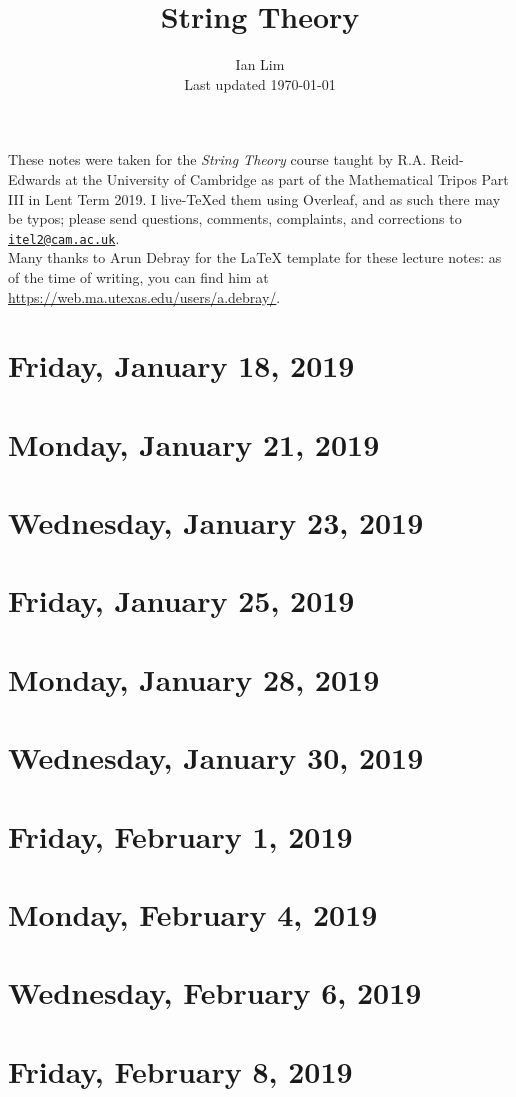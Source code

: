 \documentclass[reqno]{amsart}
\begin{document}
\title{String Theory}
\author{Ian Lim\\ Last updated \today}
\maketitle
{\small\noindent These notes were taken for the \textit{String Theory} course taught by R.A. Reid-Edwards at the University of Cambridge as part of the Mathematical Tripos Part III in Lent Term 2019. I live-\TeX ed them using Overleaf, and as such there may be typos; please send questions, comments, complaints, and corrections to 
\href{mailto:itel2@cam.ac.uk?subject=STR\%20Lecture\%20Notes}{\texttt{itel2@cam.ac.uk}}.\\
Many thanks to Arun Debray for the {\LaTeX} template for these lecture notes: as of the time of writing, you can find him at \url{https://web.ma.utexas.edu/users/a.debray/}.}

\tableofcontents

\section{Friday, January 18, 2019}
	

\section{Monday, January 21, 2019}
    

\section{Wednesday, January 23, 2019}
    
    
\section{Friday, January 25, 2019}
    

\section{Monday, January 28, 2019}
    
    
\section{Wednesday, January 30, 2019}
    
    
\section{Friday, February 1, 2019}
    

\section{Monday, February 4, 2019}
    
    
\section{Wednesday, February 6, 2019}
    

\section{Friday, February 8, 2019}
    
\end{document}

